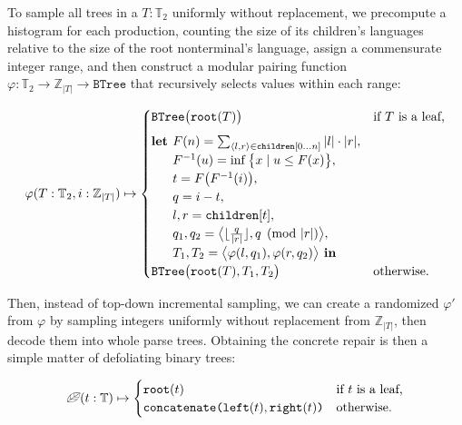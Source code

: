 \documentclass[runningheads]{llncs}
\begin{document}
To sample all trees in a $T: \mathbb{T}_2$ uniformly without replacement, we precompute a histogram for each production, counting the size of its children's languages relative to the size of the root nonterminal's language, assign a commensurate integer range, and then construct a modular pairing function $\varphi: \mathbb{T}_2 \rightarrow \mathbb{Z}_{|T|} \rightarrow \texttt{BTree}$ that recursively selects values within each range:

\begin{equation}\label{eq:pairing}
  \varphi(T: \mathbb{T}_2, i: \mathbb{Z}_{|T|}) \mapsto \begin{cases}
  \texttt{BTree}\big(\texttt{root}(T)\big) & \text{if $T$ is a leaf,} \vspace{5pt}\\
  \textbf{let } F(n) = \sum_{\langle l, r\rangle \in \texttt{children}[0 \ldots n]}|l|\cdot|r|,\\
  \phantom{\textbf{let }} F^{-1}(u) = \inf \big\{x \mid u \leq F(x)\big\},\\
  \phantom{\textbf{let }} t = F\big(F^{-1}(i)\big),\\
  \phantom{\textbf{let }} q = i - t,\\
  \phantom{\textbf{let }} l, r = \texttt{children}[t],\\
  \phantom{\textbf{let }} q_1, q_2 = \big\langle\lfloor\frac{q}{|r|}\rfloor, q \pmod{|r|}\big\rangle,\\
  \phantom{\textbf{let }} T_1, T_2 = \big\langle\varphi(l, q_1), \varphi(r, q_2)\big\rangle \textbf{ in } \\
  \texttt{BTree}\big(\texttt{root}(T), T_1, T_2\big) & \text{otherwise.} \\
  \end{cases}
\end{equation}

Then, instead of top-down incremental sampling, we can create a randomized $\varphi'$ from $\varphi$ by sampling integers uniformly without replacement from $\mathbb{Z}_{|T|}$, then decode them into whole parse trees. Obtaining the concrete repair is then a simple matter of defoliating binary trees:

\begin{equation}
\text{\textleaf}(t: \mathbb{T}) \mapsto \begin{cases}
\texttt{root}(t) & \text{if $t$ is a leaf,} \\
\texttt{concatenate(left}(t), \texttt{right}(t)\texttt{)} & \text{otherwise.}
\end{cases}
\end{equation}
\end{document}

